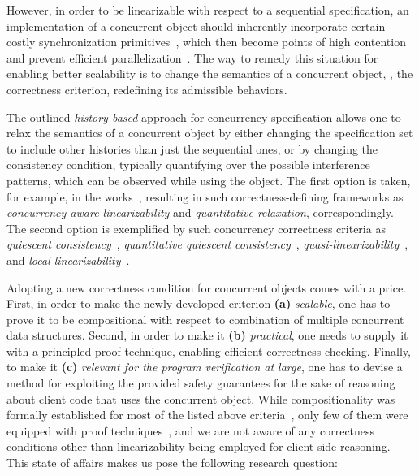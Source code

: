 However, in order to be linearizable with respect to a sequential
specification, an implementation of a concurrent object should
inherently incorporate certain costly synchronization
primitives~\cite{Attiya-al:POPL11}, which then become points of high
contention and prevent efficient
parallelization~\cite{Shavit:CACM11}. The way to remedy this situation
for enabling better scalability is to change the semantics of a
concurrent object, \ie, the correctness criterion, redefining its
admissible behaviors.

The outlined \emph{history-based} approach for concurrency
specification allows one to relax the semantics of a concurrent object
by either changing the specification set to include other histories
than just the sequential ones, or by changing the consistency
condition, typically quantifying over the possible interference
patterns, which can be observed while using the object. The first
option is taken, for example, in the
works~\cite{Hemed-Rinetzky:PODC14,Henzinger-al:POPL13}, resulting in
such correctness-defining frameworks as \emph{concurrency-aware
  linearizability} and \emph{quantitative relaxation},
correspondingly. The second option is exemplified by such concurrency
correctness criteria as \emph{quiescent
  consistency}~\cite{Aspnes-al:JACM94,Derrick-al:FM14},
\emph{quantitative quiescent
  consistency}~\cite{Jagadeesan-Riely:ICALP14},
\emph{quasi-linearizability}~\cite{Afek-al:OPODIS10}, and \emph{local
  linearizability}~\cite{Haas-al-local15}.

Adopting a new correctness condition for concurrent objects comes with
a price. First, in order to make the newly developed criterion
\textbf{(a)} \emph{scalable}, one has to prove it to be compositional
with respect to combination of multiple concurrent data
structures. Second, in order to make it \textbf{(b)} \emph{practical},
one needs to supply it with a principled proof technique, enabling
efficient correctness checking. Finally, to make it \textbf{(c)}
\emph{relevant for the program verification at large}, one has to
devise a method for exploiting the provided safety guarantees for the
sake of reasoning about client code that uses the concurrent object.
%
While compositionality was formally established for most of the listed
above
criteria~\cite{Aspnes-al:JACM94,Jagadeesan-Riely:ICALP14,Afek-al:OPODIS10,Haas-al-local15},
only few of them were equipped with proof
techniques~\cite{Derrick-al:FM14,Zhang-al:ASE13}, and we are not aware
of any correctness conditions other than linearizability being
employed for client-side reasoning. This state of affairs makes us
pose the following research question:

